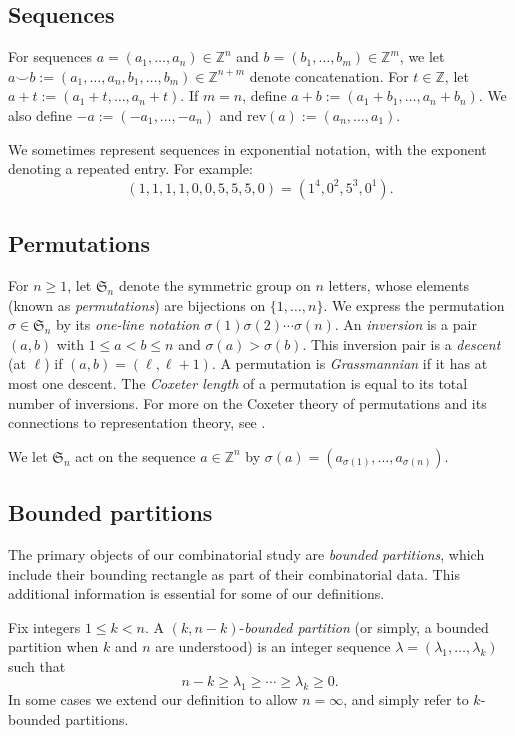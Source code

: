 \documentclass{amsart}
\newcommand\Z{\mathbb{Z}}
\theoremstyle{plain}
\theoremstyle{definition}
\numberwithin{equation}{section}
\begin{document}
\subsection{Sequences}
For sequences $a=(a_1,\dots,a_n)\in\mathbb{Z}^n$ and $b=(b_1,\dots,b_m)\in\Z^m$, we let $a\smile b:=(a_1,\dots,a_n,b_1,\dots,b_m)\in\Z^{n+m}$ denote concatenation. For $t\in\mathbb{Z}$, let $a+t:=(a_1+t,\dots,a_n+t)$. If $m=n$, define $a+b:=(a_1+b_1,\dots,a_n+b_n)$. We also define $-a:=(-a_1,\dots,-a_n)$ and $\mathrm{rev}(a):=(a_n,\dots,a_1)$.

We sometimes represent sequences in exponential notation, with the exponent denoting a repeated entry. For example:
\[(1,1,1,1,0,0,5,5,5,0)=(1^4,0^2,5^3,0^1).\]

\subsection{Permutations}
For $n\geq 1$, let $\mathfrak{S}_n$ denote the symmetric group on $n$ letters, whose elements (known as \emph{permutations}) are bijections on $\{1,\dots,n\}$. We express the permutation $\sigma\in\mathfrak{S}_n$ by its \emph{one-line notation} $\sigma(1)\sigma(2)\cdots\sigma(n)$. An \emph{inversion} is a pair $(a,b)$ with $1\leq a<b\leq n$ and $\sigma(a)>\sigma(b)$. This inversion pair is a \emph{descent} (at $\ell$) if $(a,b)=(\ell,\ell+1)$. A permutation is \emph{Grassmannian} if it has at most one descent. The \emph{Coxeter length} of a permutation is equal to its total number of inversions. For more on the Coxeter theory of permutations and its connections to representation theory, see \cite{CoCG}.

We let $\mathfrak{S}_n$ act on the sequence $a\in\mathbb{Z}^n$ by $\sigma(a)=(a_{\sigma(1)},\dots,a_{\sigma(n)})$.

\subsection{Bounded partitions}
\label{sec:partitions}

The primary objects of our combinatorial study are \emph{bounded partitions}, which include their bounding rectangle as part of their combinatorial data. This additional information is essential for some of our definitions.

Fix integers $1\leq k< n$. A $(k,n-k)$-\emph{bounded partition} (or simply, a bounded partition when $k$ and $n$ are understood) is an integer sequence $\lambda=(\lambda_1,\dots,\lambda_k)$ such that
\[n-k\geq\lambda_1\geq\cdots\geq\lambda_k\geq 0.\]
In some cases we extend our definition to allow $n=\infty$, and simply refer to $k$-bounded partitions.
\end{document}
